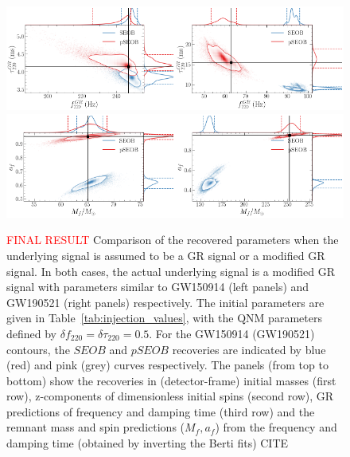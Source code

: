 \documentclass[twocolumn,prd,superscriptaddress,amsfonts,amssymb,amsmath,preprintnumbers]{revtex4-1}
\newcommand{\df}[1]{\delta f_{\text{#1}}}
\newcommand{\dtau}[1]{\delta \tau_{\text{#1}}}
\begin{document}
\begin{figure}
	\includegraphics[width=0.5\textwidth]{figures/GW150914_simulated_signal_0p5_gr_ngr_fgrtaugr.png}\includegraphics[width=0.5\textwidth]{figures/GW190521_simulated_signal_0p5_gr_ngr_fgrtaugr.png}
	\includegraphics[width=0.5\textwidth]{figures/GW150914_simulated_signal_0p5_gr_ngr_Mfaf.png}\includegraphics[width=0.5\textwidth]{figures/GW190521_simulated_signal_0p5_gr_ngr_Mfaf.png}
	\caption{\textcolor{red}{FINAL RESULT} Comparison of the recovered parameters when the underlying signal is assumed to be a GR signal or a modified GR signal. In both cases, the actual underlying signal is a modified GR signal with parameters similar to GW150914 (left panels) and GW190521 (right panels) respectively. The initial parameters are given in Table~\ref{tab:injection_values}, with the QNM parameters defined by $\df{220} = \dtau{220} = 0.5$. For the GW150914 (GW190521) contours, the $SEOB$ and $pSEOB$ recoveries are indicated by blue (red) and pink (grey) curves respectively. The panels (from top to bottom) show the recoveries in (detector-frame) initial masses (first row), z-components of dimensionless initial spins (second row), GR predictions of frequency and damping time (third row) and the remnant mass and spin predictions ($M_f, a_f$) from the frequency and damping time (obtained by inverting the Berti fits) CITE}
	\label{fig:gr_ngr_comparison}
\end{figure}
\end{document}

